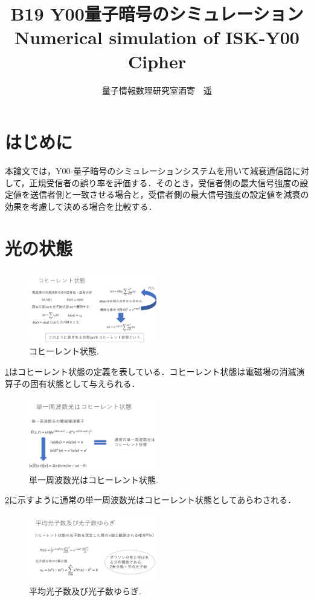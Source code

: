 \documentclass[a4j,twocolumn]{jarticle}
\title{\vspace{-2em}B19 Y00量子暗号のシミュレーション\\
\vspace{0.5cm}
\normalsize{Numerical simulation of ISK-Y00 Cipher}}
\date{}
\author{量子情報数理研究室\hspace{50mm}酒寄　遥}
\def \figref #1{\figurename\ref{#1}}
\begin{document}
\maketitle
\thispagestyle{empty}
\section{はじめに}
本論文では，Y00-量子暗号のシミュレーションシステムを用いて減衰通信路に対して，正規受信者の誤り率を評価する．そのとき，受信者側の最大信号強度の設定値を送信者側と一致させる場合と，受信者側の最大信号強度の設定値を減衰の効果を考慮して決める場合を比較する．
\section{光の状態
}
\begin{figure}[htbp]
        \centering   
        \includegraphics[width=0.5\textwidth]{img/zemi9.png}
        \caption[sample image (png)]{コヒーレント状態.}
        \label{Fig:1_5_1}
    \end{figure}
    
    \figref{Fig:1_5_1}はコヒーレント状態の定義を表している．コヒーレント状態は電磁場の消滅演算子の固有状態として与えられる．
    
\begin{figure}[htbp]
        \centering   
        \includegraphics[width=0.5\textwidth]{img/zemi10.png}
        \caption[sample image (png)]{単一周波数光はコヒーレント状態.}
        \label{Fig:1_5_2}
    \end{figure}
    
    \figref{Fig:1_5_2}に示すように通常の単一周波数光はコヒーレント状態としてあらわされる．

\begin{figure}[htbp]
        \centering   
        \includegraphics[width=0.5\textwidth]{img/zemi11.png}
        \caption[sample image (png)]{平均光子数及び光子数ゆらぎ.}
        \label{Fig:1_5_3}
    \end{figure}
    
\end{document}
